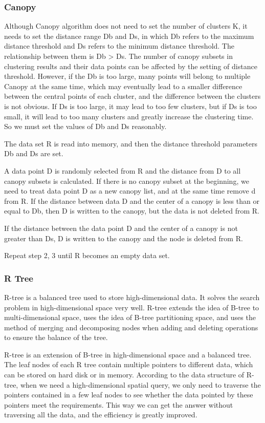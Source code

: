\documentclass[runningheads]{llncs}
\begin{document}
\subsubsection{Canopy}
Although Canopy algorithm\cite{Canopy} does not need to set the number of clusters K, it needs to set the distance range Db and Ds, in which Db refers to the maximum distance threshold and Ds refers to the minimum distance threshold. The relationship between them is Db > Ds. The number of canopy subsets in clustering results and their data points can be affected by the setting of distance threshold. However, if the Db is too large, many points will belong to multiple Canopy at the same time, which may eventually lead to a smaller difference between the central points of each cluster, and the difference between the clusters is not obvious. If Ds is too large, it may lead to too few clusters, but if Ds is too small, it will lead to too many clusters and greatly increase the clustering time. So we must set the values of Db and Ds reasonably.

The data set R is read into memory, and then the distance threshold parameters Db and Ds are set.

A data point D is randomly selected from R and the distance from D to all canopy subsets is calculated. If there is no canopy subset at the beginning, we need to treat data point D as a new canopy list, and at the same time remove d from R. If the distance between data D and the center of a canopy is less than or equal to Db, then D is written to the canopy, but the data is not deleted from R.

If the distance between the data point D and the center of a canopy is not greater than Ds, D is written to the canopy and the node is deleted from R.

Repeat step 2, 3 until R becomes an empty data set.
\subsubsection{R Tree}
R-tree\cite{RTree} is a balanced tree used to store high-dimensional data. It solves the search problem in high-dimensional space very well. R-tree extends the idea of B-tree to multi-dimensional space, uses the idea of B-tree partitioning space, and uses the method of merging and decomposing nodes when adding and deleting operations to ensure the balance of the tree.

R-tree is an extension of B-tree in high-dimensional space and a balanced tree. The leaf nodes of each R tree contain multiple pointers to different data, which can be stored on hard disk or in memory. According to the data structure of R-tree, when we need a high-dimensional spatial query, we only need to traverse the pointers contained in a few leaf nodes to see whether the data pointed by these pointers meet the requirements. This way we can get the answer without traversing all the data, and the efficiency is greatly improved.
\end{document}
